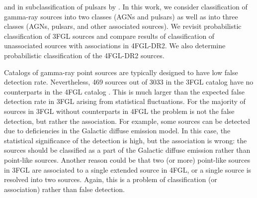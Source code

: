 and in subclassification of pulsars by \cite{2012MNRAS.424.2832L, 2016ApJ...820....8S}.
In this work, we consider classification of gamma-ray sources into two classes (AGNs and pulsars) as well as into three classes 
(AGNs, pulsars, and other associated sources).
We revisit probabilistic classification of 3FGL sources and compare results of classification of unassociated sources
with associations in 4FGL-DR2.
We also determine probabilistic classification of the 4FGL-DR2 sources.


Catalogs of gamma-ray point sources are typically designed to have low false detection rate. 
Nevertheless, 469 sources out of 3033 in the 3FGL catalog \citep{2015ApJS..218...23A} have no counterparts 
in the 4FGL catalog \citep{2020ApJS..247...33A}.
This is much larger than the expected false detection rate in 3FGL arising from statistical fluctuations.
For the majority of sources in 3FGL without counterparts in 4FGL the problem is not the false detection, 
but rather the association.
For example, some sources can be detected due to deficiencies in the Galactic diffuse emission model.
In this case, the statistical significance of the detection is high, but the association is wrong: the sources should be classified as
a part of the Galactic diffuse emission rather than point-like sources.
Another reason could be that two (or more) point-like sources in 3FGL are associated to a single extended source in 4FGL,
or a single source is resolved into two sources.
Again, this is a problem of classification (or association) rather than false detection.

